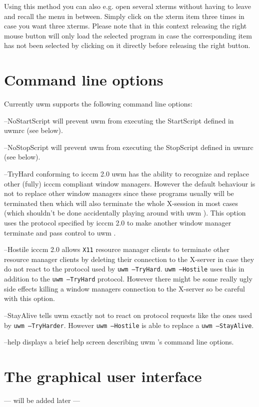 \documentclass[10pt,a4paper]{article}
\newcommand{\uwm}{{\sc uwm} }
\newenvironment{ttdesc}[1]{
   \begin{list}{}{
          \renewcommand{\makelabel}[1]{\texttt{##1\hfill}}}}{\end{list}}
\begin{document}
Using this method you can also e.g. open several xterms without having to leave and recall the menu in between. Simply click on the xterm item three times in case you want three xterms. Please note that in this context releasing the right mouse button will only load the selected program in case the corresponding item has not been selected by clicking on it directly before releasing the right button.

\part{Command line options}
Currently uwm supports the following command line options:
\begin{ttdesc}{description}
\item[--NoStartScript] will prevent \uwm from executing the StartScript defined in uwmrc (see below).
\item[--NoStopScript] will prevent \uwm from executing the StopScript defined in uwmrc (see below).
\item[--TryHard] conforming to \textsf{icccm 2.0} \uwm has the ability to recognize and replace other (fully) icccm compliant window managers. However the default behaviour is not to replace other window managers since these programs usually will be terminated then which will also terminate the whole X-session in most cases (which shouldn't be done accidentally playing around with \uwm). This option uses the protocol specified by \textsf{icccm 2.0} to make another window manager terminate and pass control to \uwm.
\item[--Hostile] \textsf{icccm 2.0} allows \texttt{X11} resource manager clients to terminate other resource manager clients by deleting their connection to the X-server in case they do not react to the protocol used by \texttt{uwm --TryHard}. \texttt{uwm --Hostile} uses this in addition to the \texttt{uwm --TryHard} protocol. However there might be some really ugly side effects killing a window managers connection to the X-server so be careful with this option.
\item[--StayAlive] tells \uwm exactly not to react on protocol requests like the ones used by \texttt{uwm --TryHarder}. However \texttt{uwm --Hostile} is able to replace a \texttt{uwm --StayAlive}.
\item[--help] displays a brief help screen describing \uwm's command line options.
\end{ttdesc}

\part{The graphical user interface}
\begin{center} --- will be added later --- \end{center}
\end{document}
